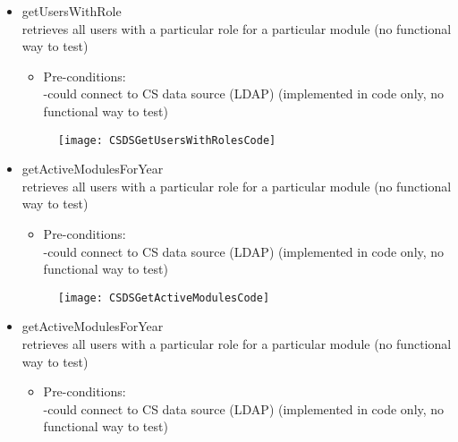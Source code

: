 \begin {itemize}
\begin {itemize}
\item {getUsersWithRole}\\
retrieves all users with a particular role for a particular module (no functional way to test)
\begin {itemize}
\item Pre-conditions:\\
-could connect to CS data source (LDAP) (implemented in code only, no functional way to test)\\  
\end {itemize}

\begin{figure}[h!]
  \centering
    \texttt{[image: CSDSGetUsersWithRolesCode]} 
\end{figure}


\end {itemize}

\begin {itemize}
\item {getActiveModulesForYear}\\
retrieves all users with a particular role for a particular module (no functional way to test)
\begin {itemize}
\item Pre-conditions:\\
-could connect to CS data source (LDAP) (implemented in code only, no functional way to test)\\  
\end {itemize}
\begin{figure}[h!]
  \centering
    \texttt{[image: CSDSGetActiveModulesCode]} 
\end{figure}
\end {itemize}

\begin {itemize}
\item {getActiveModulesForYear}\\
retrieves all users with a particular role for a particular module (no functional way to test)
\begin {itemize}
\item Pre-conditions:\\
-could connect to CS data source (LDAP) (implemented in code only, no functional way to test)\\  
\end {itemize}
	
\end {itemize}






\end {itemize}
